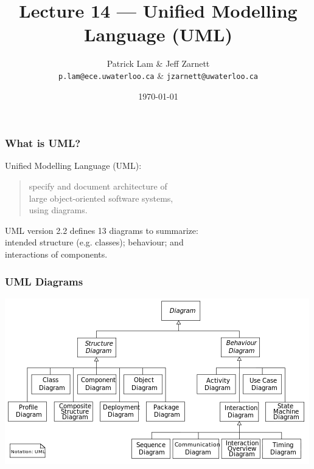

\title{Lecture 14 --- Unified Modelling Language (UML)}

\author{Patrick Lam \& Jeff Zarnett \\ \small \texttt{p.lam@ece.uwaterloo.ca} \& \texttt{jzarnett@uwaterloo.ca}}
\date{\today}


\begin{frame}
  \titlepage
\end{frame}

\begin{frame}
\frametitle{What is UML?}
\begin{changemargin}{1cm}
Unified Modelling Language (UML):

\begin{quote}
specify and document architecture of\\ large object-oriented software systems, \\ using diagrams.
\end{quote}

UML version 2.2 defines  13 diagrams to summarize:\\
 \qquad intended structure (e.g. classes); behaviour; and \\
\qquad interactions of components.
\end{changemargin}
\end{frame}

\begin{frame}
\frametitle{UML Diagrams}
\begin{center}
\includegraphics[width=\textwidth]{images/uml-overview}
\end{center}
\end{frame}


